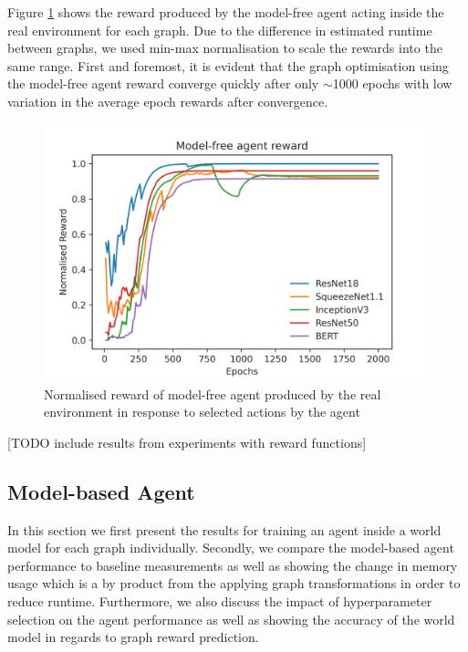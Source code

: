 Figure \ref{fig:eval:mf-agent-reward} shows the reward produced by the model-free agent acting inside the real environment for each graph. Due to the difference in estimated runtime between graphs, we used min-max normalisation to scale the rewards into the same range. First and foremost, it is evident that the graph optimisation using the model-free agent reward converge quickly after only $\sim$1000 epochs with low variation in the average epoch rewards after convergence.

\begin{figure}[h]
  \centering
  \includegraphics[width=1\columnwidth]{sections/5evaluation/images/mf_training_reward.png}
  \caption[Epoch reward during training of model-free agent]{Normalised reward of model-free agent produced by the real environment in response to selected actions by the agent}
  \label{fig:eval:mf-agent-reward}
\end{figure}

[TODO include results from experiments with reward functions]

\subsection{Model-based Agent}
\label{sec:eval:subsec:mbagent}

In this section we first present the results for training an agent inside a world model for each graph individually. Secondly, we compare the model-based agent performance to baseline measurements as well as showing the change in memory usage which is a by product from the applying graph transformations in order to reduce runtime. Furthermore, we also discuss the impact of hyperparameter selection on the agent performance as well as showing the accuracy of the world model in regards to graph reward prediction.

